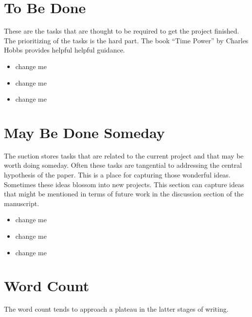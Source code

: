 \documentclass[10pt,letterpaper]{article}
\begin{document}
\section{To Be Done}

These are the tasks that are thought to be required to get the project finished.
The prioritizing of the tasks is the hard part.
The book ``Time Power'' by Charles Hobbs provides helpful helpful guidance.


\begin{itemize}
  \item change me
  \item change me
  \item change me
\end{itemize}



\section{May Be Done Someday}

The suction stores tasks that are related to the current project and that may be worth doing someday.
Often these tasks are tangential to addressing the central hypothesis of the paper.
This is a place for capturing those wonderful ideas.
Sometimes these ideas blossom into new projects.
This section can capture ideas that might be mentioned in terms of future work in the discussion section of the manuscript.


\begin{itemize}
  \item change me
  \item change me
  \item change me
\end{itemize}


\section{Word Count}

The word count tends to approach a plateau in the latter stages of writing.

\begin{figure}[htp!]
  \centering
\end{figure}
\end{document}
